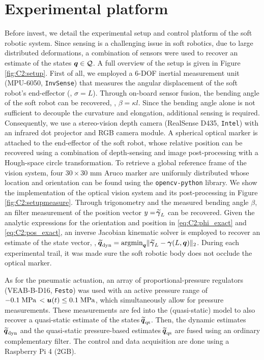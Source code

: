 \section{Experimental platform}
\noindent Before invest, we detail the experimental setup and control platform of the soft robotic system. Since sensing is a challenging issue in soft robotics, due to large distributed deformations, a combination of sensors were used to recover an estimate of the states ${\boldsymbol{q}} \in \mathcal{Q}$. A full overview of the setup is given in Figure \ref{fig:C2:setup}. First of all, we employed a 6-DOF inertial measurement unit (MPU-6050, \texttt{InvSense}) that measures the angular displacement of the soft robot's end-effector (\ie, $\sigma = L$). Through on-board sensor fusion, the bending angle of the soft robot can be recovered, \ie, $\beta = \kappa l$. Since the bending angle alone is not sufficient to decouple the curvature and elongation, additional sensing is required. Consequently, we use a stereo-vision depth camera (RealSense D435, \texttt{Intel}) with an infrared dot projector and RGB camera module. A spherical optical marker is attached to the end-effector of the soft robot, whose relative position can be recovered using a combination of depth-sensing and image post-processing with a Hough-space circle transformation. To retrieve a global reference frame of the vision system, four $30\!\times \!30$ \si{\milli \metre} Aruco marker are uniformly distributed whose location and orientation can be found using the \texttt{opencv-python} library. We show the implementation of the optical vision system and its post-processing in Figure \ref{fig:C2:setupmeasure}. Through trigonometry and the measured bending angle $\beta$, an filter measurement of the position vector $y = \widetilde{\!\boldsymbol{\gamma}}_L$ can be recovered. Given the analytic expressions for the orientation and position in \eqref{eq:C2:phi_exact} and \eqref{eq:C2:pos_exact}, an inverse Jacobian kinematic solver is employed to recover an estimate of the state vector, \ie, $\widetilde{\!\boldsymbol{q}}_{\textrm{dyn}} = \textrm{argmin}_{{\boldsymbol{q}}} \lVert \, \widetilde{\!\boldsymbol{\gamma}}_L - {\boldsymbol{\gamma}}(L,{\boldsymbol{q}}) \rVert_2$. During each experimental trail, it was made sure the soft robotic body does not occlude the optical marker.

As for the pneumatic actuation, an array of proportional-pressure regulators (VEAB-B-D16, \texttt{Festo}) was used with an active pressure range of $-0.1 \;\text{MPa}\, < {\boldsymbol{u}}(t) \le 0.1 \; \textrm{MPa}$, which simultaneously allow for pressure measurements. These measurements are fed into the (quasi-static) model to also recover a quasi-static estimate of the states $\widetilde{\!\boldsymbol{q}}_{\textrm{qs}}$. Then, the dynamic estimates $\widetilde{\!\boldsymbol{q}}_{\textrm{dyn}}$ and the quasi-static pressure-based estimates $\widetilde{\!\boldsymbol{q}}_{\textrm{qs}}$ are fused using an ordinary complementary filter. The control and data acquisition are done using a {Raspberry Pi 4} (2GB). 

